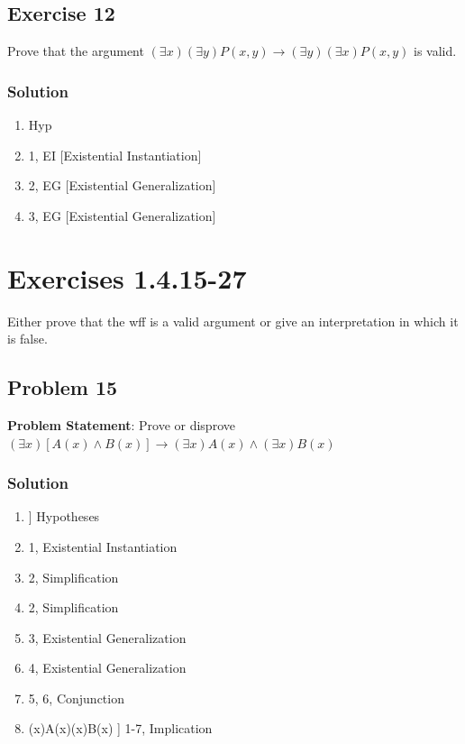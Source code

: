 \documentclass[12pt]{article}
\begin{document}
\subsection*{Exercise 12}
Prove that the argument \( (\exists x)(\exists y)P(x,y)\rightarrow (\exists y)(\exists x)P(x,y) \) is valid.

\subsubsection*{Solution}
\begin{enumerate}[left=0em,labelwidth=4em,align=left]
    \item[\( (\exists x)(\exists y)P(x,y) \)] \hfill Hyp
    \item[\( P(a, b) \)] \hfill 1, EI [Existential Instantiation]
    \item[\( (\exists y)P(a, y) \)] \hfill 2, EG [Existential Generalization]
    \item[\( (\exists x)(\exists y)P(x, y) \)] \hfill 3, EG [Existential Generalization]
\end{enumerate}




\newpage
\section*{Exercises 1.4.15-27}
Either prove that the wff is a valid argument or give an interpretation in which it is false.
\subsection*{Problem 15}
\textbf{Problem Statement}: Prove or disprove \( (\exists x)[A(x)\land B(x)]\rightarrow (\exists x)A(x)\land (\exists x)B(x) \)

\subsubsection*{Solution}
\begin{enumerate}[left=0em,labelwidth=4em,align=left]
    \item[\( (\exists x)[A(x)\land B(x)] \)] \hfill Hypotheses
    \item[\( A(a) \land B(a) \)] \hfill 1, Existential Instantiation
    \item[\( A(a) \)] \hfill 2, Simplification
    \item[\( B(a) \)] \hfill 2, Simplification
    \item[\( (\exists x) A(x) \)] \hfill 3, Existential Generalization
    \item[\( (\exists x) B(x) \)] \hfill 4, Existential Generalization
    \item[\( (\exists x) A(x) \land (\exists x) B(x) \)] \hfill 5, 6, Conjunction
    \item[\( (\exists x)[A(x)\land B(x)]\rightarrow (\exists x)A(x)\land (\exists x)B(x) \)] \hfill 1-7, Implication
\end{enumerate}
\newpage
\end{document}
